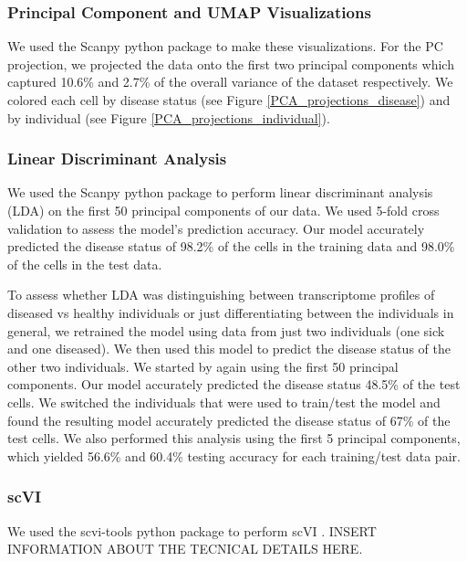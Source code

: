 \documentclass{article}
\begin{document}
\subsubsection{Principal Component and UMAP Visualizations}
We used the Scanpy python package \citep{wolf_scanpy_2018} to make these visualizations.
For the PC projection, we projected the data onto the first two principal components which captured 10.6\% and 2.7\% of the overall variance of the dataset respectively.
We colored each cell by disease status (see Figure \ref{PCA_projections_disease}) and by individual (see Figure \ref{PCA_projections_individual}).

\subsubsection{Linear Discriminant Analysis}
We used the Scanpy python package \citep{wolf_scanpy_2018} to perform linear discriminant analysis (LDA) on the first 50 principal components of our data.
We used 5-fold cross validation to assess the model's prediction accuracy.
Our model accurately predicted the disease status of 98.2\% of the cells in the training data and 98.0\% of the cells in the test data.

To assess whether LDA was distinguishing between transcriptome profiles of diseased vs healthy individuals or just differentiating between the individuals in general, we retrained the model using data from just two individuals (one sick and one diseased).
We then used this model to predict the disease status of the other two individuals.
We started by again using the first 50 principal components.
Our model accurately predicted the disease status 48.5\% of the test cells.
We switched the individuals that were used to train/test the model and found the resulting model accurately predicted the disease status of 67\% of the test cells.
We also performed this analysis using the first 5 principal components, which yielded 56.6\% and 60.4\% testing accuracy for each training/test data pair.

\subsubsection{scVI}
We used the scvi-tools python package to perform scVI \citep{lopez_deep_2018, gayoso_python_2022}.
INSERT INFORMATION ABOUT THE TECNICAL DETAILS HERE.
\end{document}
